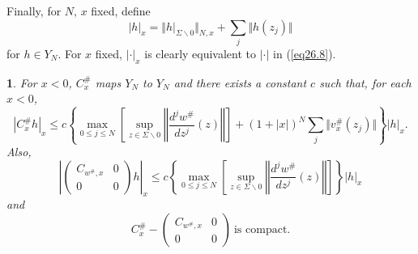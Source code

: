 \documentclass{surv-l}
\theoremstyle{plain}
\newtheorem{prop}[theorem]{\sc{Proposition}}
\theoremstyle{definition}
\numberwithin{equation}{chapter}
\begin{document}
Finally, for $N,\, x$ fixed, define
\begin{equation}\label{eq27.3}
|h|_{x}=\Vert h|_{\Sigma\backslash 0}\Vert_{N,x}+\sum_{j}\Vert h(z_{j})\Vert
\end{equation}
for $h\in Y_{N}$. For $x$ fixed, $|\cdot |_{x}$ is clearly equivalent to $|\cdot |$ in (\ref{eq26.8}).
\renewcommand\thetheorem{27.\arabic{theorem}}
\setcounter{theorem}{3}
\begin{prop}\label{prop27.4}
For $x<0$, $C_{x}^{\#}$ maps $Y_{N}$ to $Y_{N}$ and there exists a constant $c$ such that, for each $x<0$,
\setcounter{equation}{4}
\begin{equation}\label{eq27.5}
|C_{x}^{\#}h|_{x}\leq c\left\{\max_{0\leq j\leq N}\left[\sup_{z\in\Sigma\backslash 0}\left\Vert\frac{d^{j}w^{\#}}{dz^{j}}(z)\right\Vert\right]+(1+|x|)^{N}\sum_{j}\Vert v_{x}^{\#}(z_{j})\Vert\right\}|h|_{x}.
\end{equation}
Also,
\begin{equation}\label{eq27.6}
\left\vert\left(\begin{array}{cc}
C_{w^{\#},x}& 0\\
0   & 0
\end{array}\right)h\right\vert_{x}\leq c\left\{\max_{0\leq j\leq N}\left[\sup_{z\in\Sigma\backslash 0}\left\Vert\frac{d^{j}w^{\#}}{dz^{j}}(z)\right\Vert\right]\right\}|h|_{x}
\end{equation}
and
\begin{equation}\label{eq27.7}
C_{x}^{\#}- \left(\begin{array}{ccc}
C_{w^{\#},x}   & 0\\
0   & 0
\end{array}\right)\ \text{is compact}.
\end{equation}
\end{prop}
\end{document}
